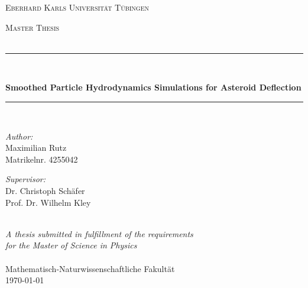 \begin{titlepage}
    \begin{center}
        {\scshape\LARGE Eberhard Karls Universität Tübingen\par}\vspace{1.5cm} %
        \textsc{\Large Master Thesis}\\[0.5cm] %
        \
        \hrule\ \\[0.0cm] %
        {\huge \bfseries Smoothed Particle Hydrodynamics Simulations for Asteroid Deflection\par}\vspace{0.8cm} %
        \hrule\ \\[1.5cm] %
        \begin{minipage}[t]{0.4\textwidth}
            \begin{flushleft} \large
                \emph{Author:}\\
                {Maximilian Rutz}\\ %
                Matrikelnr. 4255042
            \end{flushleft}
        \end{minipage}
        \begin{minipage}[t]{0.4\textwidth}
            \begin{flushright} \large
                \emph{Supervisor:}\\
                {Dr. Christoph Schäfer}\\
                {Prof. Dr. Wilhelm Kley} %
            \end{flushright}
        \end{minipage}\\[3cm]
        \vfill
        \large \textit{A thesis submitted in fulfillment of the requirements\\ for the Master of Science in Physics}\\[0.3cm] %
        \ \\[0.8cm]
        Mathematisch-Naturwissenschaftliche Fakultät\\[2cm] %
        \vfill
        {\large \today}\\[4cm] %
        \vfill
    \end{center}
\end{titlepage}